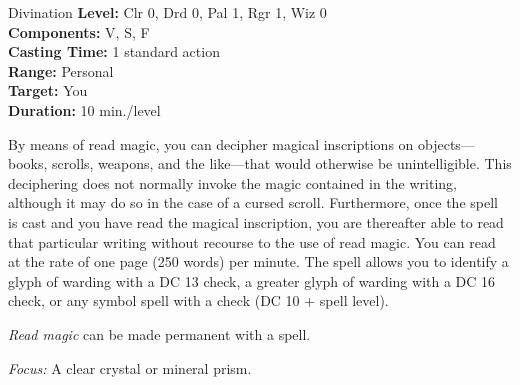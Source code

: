 {Divination}
{
	\textbf{Level:}
	Clr 0, Drd 0, Pal 1, Rgr 1, Wiz 0\\
	\textbf{Components:}
	V, S, F\\
	\textbf{Casting Time:}
	1 standard action\\
	\textbf{Range:}
	Personal\\
	\textbf{Target:}
	You\\
	\textbf{Duration:}
	10 min./level\\
}
{
	By means of read magic, you can decipher magical inscriptions on objects---books, scrolls, weapons, and the like---that would otherwise be unintelligible. This deciphering does not normally invoke the magic contained in the writing, although it may do so in the case of a cursed scroll. Furthermore, once the spell is cast and you have read the magical inscription, you are thereafter able to read that particular writing without recourse to the use of read magic. You can read at the rate of one page (250 words) per minute. The spell allows you to identify a glyph of warding with a DC 13  check, a greater glyph of warding with a DC 16  check, or any symbol spell with a  check (DC 10 + spell level).

	\emph{Read magic} can be made permanent with a  spell.

	\textit{Focus:}
	A clear crystal or mineral prism.

}
